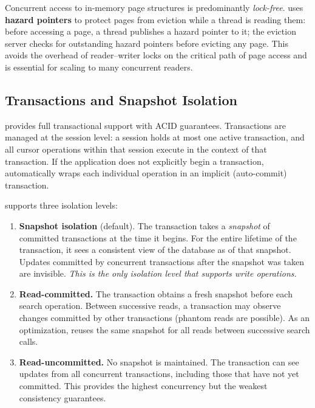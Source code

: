 Concurrent access to in-memory page structures is predominantly
\emph{lock-free}.
\wt{} uses \textbf{hazard pointers} to protect pages from eviction while a thread is reading them: before accessing a page, a thread publishes a hazard pointer to it; the eviction server checks for outstanding hazard pointers before evicting any page.
This avoids the overhead of reader--writer locks on the critical path of page access and is essential for scaling to many concurrent readers.

\subsection{Transactions and Snapshot Isolation}
\label{sec:wt-txn}

\wt{} provides full transactional support with \ac{ACID} guarantees.
Transactions are managed at the session level: a session holds at most one
active transaction, and all cursor operations within that session execute in
the context of that transaction.
If the application does not explicitly begin a transaction, \wt{} automatically wraps each individual operation in an implicit (auto-commit) transaction.

\wt{} supports three isolation levels:

\begin{enumerate}
  \item \textbf{Snapshot isolation} (default).  The transaction takes a
    \emph{snapshot} of committed transactions at the time it begins.  For the
    entire lifetime of the transaction, it sees a consistent view of the
    database as of that snapshot.  Updates committed by concurrent transactions
    after the snapshot was taken are invisible.  \emph{This is the only
    isolation level that supports write operations.}

  \item \textbf{Read-committed.}  The transaction obtains a fresh snapshot
    before each search operation.  Between successive reads, a transaction may
    observe changes committed by other transactions (phantom reads are
    possible).  As an optimization, \wt{} reuses the same snapshot for all
    reads between successive search calls.

  \item \textbf{Read-uncommitted.}  No snapshot is maintained.  The transaction
    can see updates from all concurrent transactions, including those that have
    not yet committed.  This provides the highest concurrency but the weakest
    consistency guarantees.
\end{enumerate}

